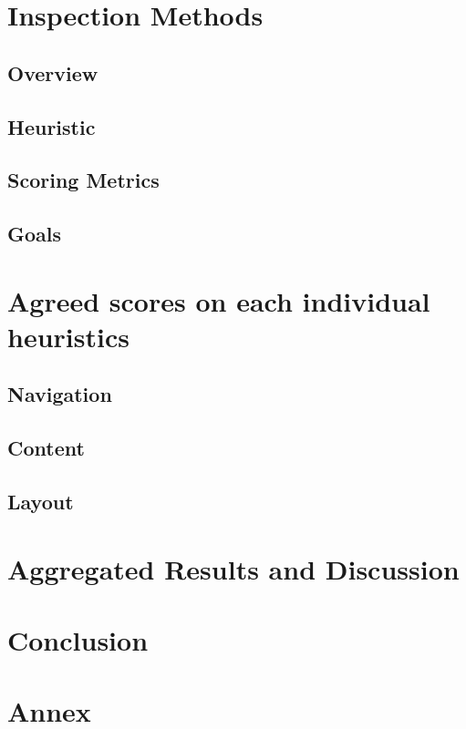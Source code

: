 \documentclass[11pt, a4paperm, hidelinks]{article}
\begin{document}
	\section{Inspection Methods}

	\subsection{Overview}
	

	\subsection{Heuristic}
	

	\subsection{Scoring Metrics}
	

	\subsection{Goals}
	
	\clearpage


	\section{Agreed scores on each individual heuristics}

	\subsection{Navigation}
	

	\subsection{Content}
	

	\subsection{Layout}
	
	\clearpage


	\section{Aggregated Results and Discussion}
	
	\clearpage

	\section{Conclusion}	
	
	\clearpage

	\appendix
	\section{Annex}
	
\end{document}
